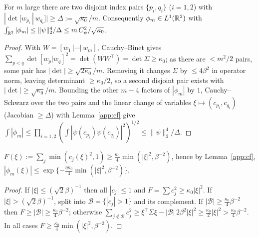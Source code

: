 \begin{lemma}\label{app:transverse}
For $m$ large there are two disjoint index pairs $\{p_i,q_i\}$ ($i=1,2$) with
$|\det[w_{p_i}\,|\,w_{q_i}]|\ge\Delta:=\sqrt{\kappa_0}/m$.  Consequently $\phi_m\in L^1(\mathbb{R}^2)$ with
$\int_{\mathbb{R}^2}|\phi_m|\le \|\psi\|_2^4/\Delta\le m\,C_\psi^2/\sqrt{\kappa_0}$.
\end{lemma}
\begin{proof}
With $W=[w_1\,|\cdots|\,w_m]$, Cauchy--Binet gives $\sum_{p<q}\det[w_p|w_q]^2=\det(WW^\top)=
\det\Sigma\ge\kappa_0$; as there are $<m^2/2$ pairs, some pair has $|\det|\ge\sqrt{2\kappa_0}/m$.
Removing it changes $\Sigma$ by $\le4\beta^2$ in operator norm, leaving determinant
$\ge\kappa_0/2$, so a second disjoint pair exists with $|\det|\ge\sqrt{\kappa_0}/m$.  Bounding the
other $m-4$ factors of $|\phi_m|$ by $1$, Cauchy--Schwarz over the two pairs and the linear change
of variables $\xi\mapsto(c_{p_i},c_{q_i})$ (Jacobian $\ge\Delta$) with Lemma~\ref{app:cf} give
$\int|\phi_m|\le\prod_{i=1,2}(\int|\psi(c_{p_i})\psi(c_{q_i})|^2)^{1/2}\le\|\psi\|_2^4/\Delta$.
\end{proof}

\begin{lemma}\label{app:energy}
$F(\xi):=\sum_j\min(c_j(\xi)^2,1)\ge\tfrac{\kappa_0}{4}\min(|\xi|^2,\beta^{-2})$, hence by
Lemma~\ref{app:cf}, $|\phi_m(\xi)|\le\exp\{-\tfrac{\eta\kappa_0}{4}\min(|\xi|^2,\beta^{-2})\}$.
\end{lemma}
\begin{proof}
If $|\xi|\le(\sqrt2\beta)^{-1}$ then all $|c_j|\le1$ and $F=\sum c_j^2\ge\kappa_0|\xi|^2$.  If
$|\xi|>(\sqrt2\beta)^{-1}$, split into $\mathcal B=\{|c_j|>1\}$ and its complement.  If
$|\mathcal B|\ge\tfrac{\kappa_0}4\beta^{-2}$ then $F\ge|\mathcal B|\ge\tfrac{\kappa_0}4\beta^{-2}$;
otherwise $\sum_{j\notin\mathcal B}c_j^2\ge\xi^\top\Sigma\xi-|\mathcal B|\,2\beta^2|\xi|^2\ge
\tfrac{\kappa_0}2|\xi|^2>\tfrac{\kappa_0}4\beta^{-2}$.  In all cases $F\ge\tfrac{\kappa_0}4\min(|\xi|^2,\beta^{-2})$.
\end{proof}

